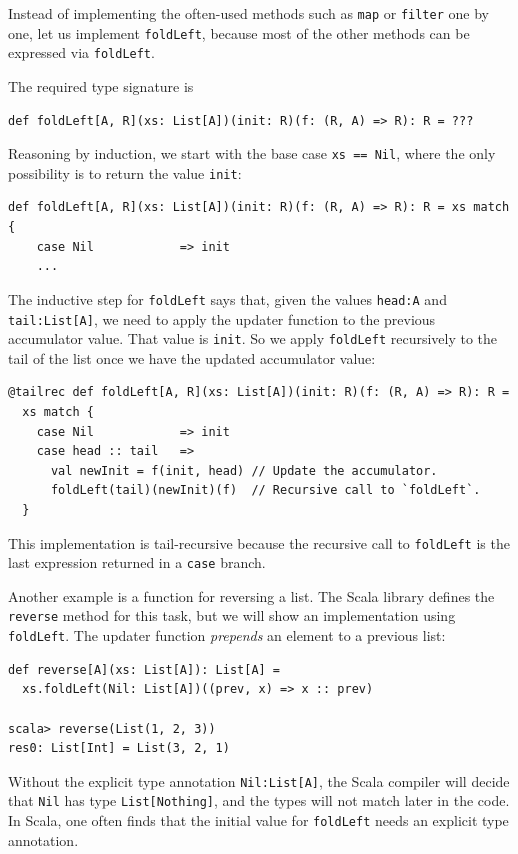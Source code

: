 Instead of implementing the often-used methods such as \lstinline!map!
or \lstinline!filter! one by one, let us implement \lstinline!foldLeft!,
because most of the other methods can be expressed via \lstinline!foldLeft!. 

The required type signature is
\begin{lstlisting}
def foldLeft[A, R](xs: List[A])(init: R)(f: (R, A) => R): R = ???
\end{lstlisting}
Reasoning by induction, we start with the base case \lstinline!xs == Nil!,
where the only possibility is to return the value \lstinline!init!:
\begin{lstlisting}
def foldLeft[A, R](xs: List[A])(init: R)(f: (R, A) => R): R = xs match {
    case Nil            => init
    ...
\end{lstlisting}
The inductive step for \lstinline!foldLeft! says that, given the
values \lstinline!head:A! and \lstinline!tail:List[A]!, we need
to apply the updater function to the previous accumulator value. That
value is \lstinline!init!. So we apply \lstinline!foldLeft! recursively
to the tail of the list once we have the updated accumulator value:
\begin{lstlisting}
@tailrec def foldLeft[A, R](xs: List[A])(init: R)(f: (R, A) => R): R =
  xs match {
    case Nil            => init
    case head :: tail   => 
      val newInit = f(init, head) // Update the accumulator.
      foldLeft(tail)(newInit)(f)  // Recursive call to `foldLeft`.
  }
\end{lstlisting}
This implementation is tail-recursive because the recursive call to
\lstinline!foldLeft! is the last expression returned in a \lstinline!case!
branch.

Another example is a function for reversing a list. The Scala library
defines the \lstinline!reverse! method for this task, but we will
show an implementation using \lstinline!foldLeft!. The updater function
\emph{prepends} an element to a previous list:
\begin{lstlisting}
def reverse[A](xs: List[A]): List[A] =
  xs.foldLeft(Nil: List[A])((prev, x) => x :: prev)

scala> reverse(List(1, 2, 3))
res0: List[Int] = List(3, 2, 1) 
\end{lstlisting}
Without the explicit type annotation \lstinline!Nil:List[A]!, the
Scala compiler will decide that \lstinline!Nil! has type \lstinline!List[Nothing]!,
and the types will not match later in the code. In Scala, one often
finds that the initial value for \lstinline!foldLeft! needs an explicit
type annotation.

